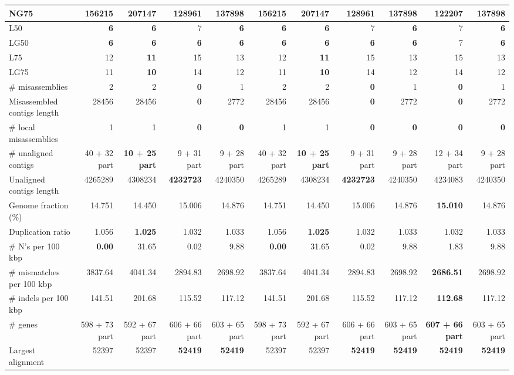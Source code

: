 \documentclass[12pt,a4paper]{article}
\begin{document}
\begin{table}[ht]
\begin{center}
\begin{tabular}{|l*{10}{|r}|}
NG75 & 156215 & {\bf 207147} & 128961 & 137898 & 156215 & {\bf 207147} & 128961 & 137898 & 122207 & 137898 \\ \hline
L50 & {\bf 6} & {\bf 6} & 7 & {\bf 6} & {\bf 6} & {\bf 6} & 7 & {\bf 6} & 7 & {\bf 6} \\ \hline
LG50 & {\bf 6} & {\bf 6} & {\bf 6} & {\bf 6} & {\bf 6} & {\bf 6} & {\bf 6} & {\bf 6} & 7 & {\bf 6} \\ \hline
L75 & 12 & {\bf 11} & 15 & 13 & 12 & {\bf 11} & 15 & 13 & 15 & 13 \\ \hline
LG75 & 11 & {\bf 10} & 14 & 12 & 11 & {\bf 10} & 14 & 12 & 14 & 12 \\ \hline
\# misassemblies & 2 & 2 & {\bf 0} & 1 & 2 & 2 & {\bf 0} & 1 & {\bf 0} & 1 \\ \hline
Misassembled contigs length & 28456 & 28456 & {\bf 0} & 2772 & 28456 & 28456 & {\bf 0} & 2772 & {\bf 0} & 2772 \\ \hline
\# local misassemblies & 1 & 1 & {\bf 0} & {\bf 0} & 1 & 1 & {\bf 0} & {\bf 0} & {\bf 0} & {\bf 0} \\ \hline
\# unaligned contigs & 40 + 32 part & {\bf 10 + 25 part} & 9 + 31 part & 9 + 28 part & 40 + 32 part & {\bf 10 + 25 part} & 9 + 31 part & 9 + 28 part & 12 + 34 part & 9 + 28 part \\ \hline
Unaligned contigs length & 4265289 & 4308234 & {\bf 4232723} & 4240350 & 4265289 & 4308234 & {\bf 4232723} & 4240350 & 4234083 & 4240350 \\ \hline
Genome fraction (\%) & 14.751 & 14.450 & 15.006 & 14.876 & 14.751 & 14.450 & 15.006 & 14.876 & {\bf 15.010} & 14.876 \\ \hline
Duplication ratio & 1.056 & {\bf 1.025} & 1.032 & 1.033 & 1.056 & {\bf 1.025} & 1.032 & 1.033 & 1.032 & 1.033 \\ \hline
\# N's per 100 kbp & {\bf 0.00} & 31.65 & 0.02 & 9.88 & {\bf 0.00} & 31.65 & 0.02 & 9.88 & 1.83 & 9.88 \\ \hline
\# mismatches per 100 kbp & 3837.64 & 4041.34 & 2894.83 & 2698.92 & 3837.64 & 4041.34 & 2894.83 & 2698.92 & {\bf 2686.51} & 2698.92 \\ \hline
\# indels per 100 kbp & 141.51 & 201.68 & 115.52 & 117.12 & 141.51 & 201.68 & 115.52 & 117.12 & {\bf 112.68} & 117.12 \\ \hline
\# genes & 598 + 73 part & 592 + 67 part & 606 + 66 part & 603 + 65 part & 598 + 73 part & 592 + 67 part & 606 + 66 part & 603 + 65 part & {\bf 607 + 66 part} & 603 + 65 part \\ \hline
Largest alignment & 52397 & 52397 & {\bf 52419} & {\bf 52419} & 52397 & 52397 & {\bf 52419} & {\bf 52419} & {\bf 52419} & {\bf 52419} \\ \hline
\end{tabular}
\end{center}
\end{table}
\end{document}
